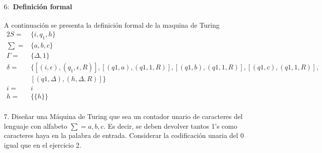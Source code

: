 \documentclass[10pt,a4paper]{book}
\begin{document}
{\begin{figure*}[ht!]
\end{figure*}
\paragraph{$6:$ Definición formal}A continuación se presenta la definición formal de la maquina de Turing\\[0.2cm]
\begin{alignat*}{2}
	S=& \{i, q_1,h\}\\
	\textstyle \sum=& \{a,b,c\}\\
	\Gamma=&\{\Delta,1\}\\
	\delta=&\{[(i,\epsilon), (q_1,\epsilon,R)], [(q1,a), (q1,1,R)], [(q1,b), (q1,1,R)], [(q1,c), (q1,1,R)],\\& [(q1,\Delta), (h,\Delta,R)]\}\\
	i=&i\\
	h=&\{\{h\}\}
\end{alignat*}
\newpage
\paragraph{}7. Diseñar una Máquina de Turing que sea un contador unario de caracteres del lenguaje con alfabeto $\sum = {a,b,c}$. Es decir, se deben devolver tantos 1’s como caracteres haya en la palabra de entrada. Considerar la codificación unaria del 0 igual que en el ejercicio 2.\\[1cm]
\begin{figure*}[ht!]
	\centering
\end{figure*}

}
\end{document}
